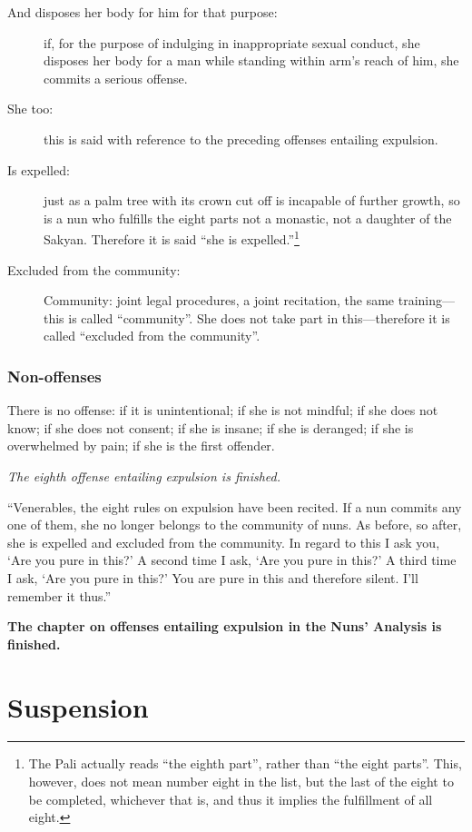 \documentclass[12pt,openany]{book}%
\let\oldcontentsline\contentsline
\newcommand{\nopagecontentsline}[3]{\oldcontentsline{#1}{#2}{}}
\newcommand*{\tocchapterline}[1]{\bfseries\itshape{#1}}
\newcommand*{\scendsutta}[1]{\begin{Center}\textit{#1}\end{Center}\addvspace{1em}}
\newcommand*{\scendkanda}[1]{\begin{Center}\textbf{#1}\end{Center}\addvspace{1em}} %
\begin{document}
\begin{description}
\item[And disposes her body for him for that purpose: ] if, for the purpose of indulging in inappropriate sexual conduct, she disposes her body for a man while standing within arm’s reach of him, she commits a serious offense. %
\item[She too: ] this is said with reference to the preceding offenses entailing expulsion. %
\item[Is expelled: ] just as a palm tree with its crown cut off is incapable of further growth, so is a nun who fulfills the eight parts not a monastic, not a daughter of the Sakyan. Therefore it is said “she is expelled.”\footnote{The Pali actually reads “the eighth part”, rather than “the eight parts”. This, however, does not mean number eight in the list, but the last of the eight to be completed, whichever that is, and thus it implies the fulfillment of all eight. } %
\item[Excluded from the community: ] Community: joint legal procedures, a joint recitation, the same training—this is called “community”. She does not take part in this—therefore it is called “excluded from the community”. %
\end{description}

\subsection*{Non-offenses }

There is no offense: if it is unintentional;  if she is not mindful;  if she does not know;  if she does not consent;  if she is insane;  if she is deranged;  if she is overwhelmed by pain;  if she is the first offender. 

\scendsutta{The eighth offense entailing expulsion is finished. }

“Venerables, the eight rules on expulsion have been recited. If a nun commits any one of them, she no longer belongs to the community of nuns. As before, so after, she is expelled and excluded from the community. In regard to this I ask you, ‘Are you pure in this?’ A second time I ask, ‘Are you pure in this?’ A third time I ask, ‘Are you pure in this?’ You are pure in this and therefore silent. I’ll remember it thus.” 

\scendkanda{The chapter on offenses entailing expulsion in the Nuns’ Analysis is finished. }

%
\chapter*{Suspension}
\addcontentsline{toc}{chapter}{\tocchapterline{Suspension}}
\addtocontents{toc}{\let\protect\contentsline\protect\oldcontentsline}
\end{document}

